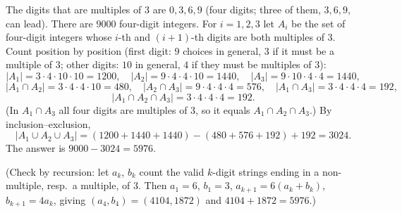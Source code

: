 The digits that are multiples of $3$ are $0,3,6,9$ (four digits; three of them, $3,6,9$, can lead). There are $9000$ four-digit integers. For $i=1,2,3$ let $A_i$ be the set of four-digit integers whose $i$-th and $(i+1)$-th digits are both multiples of $3$. Count position by position (first digit: $9$ choices in general, $3$ if it must be a multiple of $3$; other digits: $10$ in general, $4$ if they must be multiples of $3$):
\[
|A_1|=3\cdot4\cdot10\cdot10=1200,\quad |A_2|=9\cdot4\cdot4\cdot10=1440,\quad |A_3|=9\cdot10\cdot4\cdot4=1440,
\]
\[
|A_1\cap A_2|=3\cdot4\cdot4\cdot10=480,\quad |A_2\cap A_3|=9\cdot4\cdot4\cdot4=576,\quad |A_1\cap A_3|=3\cdot4\cdot4\cdot4=192,
\]
\[
|A_1\cap A_2\cap A_3|=3\cdot4\cdot4\cdot4=192 .
\]
(In $A_1\cap A_3$ all four digits are multiples of $3$, so it equals $A_1\cap A_2\cap A_3$.) By inclusion--exclusion,
\[
|A_1\cup A_2\cup A_3|=(1200+1440+1440)-(480+576+192)+192=3024 .
\]
The answer is $9000-3024=\boxed{5976}$.

(Check by recursion: let $a_k$, $b_k$ count the valid $k$-digit strings ending in a non-multiple, resp.\ a multiple, of $3$. Then $a_1=6$, $b_1=3$, $a_{k+1}=6(a_k+b_k)$, $b_{k+1}=4a_k$, giving $(a_4,b_4)=(4104,1872)$ and $4104+1872=5976$.)
